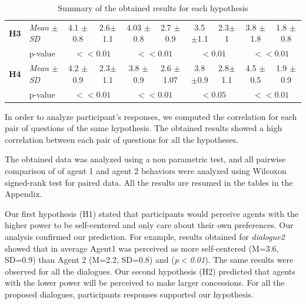 \documentclass{llncs}
\begin{document}
\begin{table}[t]
\begin{tabular}{|ll|c|c|c|c|c|c|c|c|}
			\newline \multirow{2}{*} {\textbf{H3}} &\multicolumn{1}{|l|}{ \textit{Mean} $\pm$ \textit{SD} } & 4.1 $\pm$ 0.8 & 2.6$\pm$ 1.1 & 4.03 $\pm$ 0.8 & 2.7 $\pm$0.9 &3.5 $\pm$1.1 & 2.3$\pm$ 1 & 3.8 $\pm$ 1.8 & 1.8 $\pm$0.8 \\
			\cline{2-10}	
			\newline & \multicolumn{1}{|l|}{p-value}  & \multicolumn{2}{c|}{ $<<0.01$} & \multicolumn{2}{c|}{ $<<0.01$} & \multicolumn{2}{c|}{ $<0.01$}& \multicolumn{2}{c|}{ $<<0.01$}\\
			\hline	
			
			
			\newline \multirow{2}{*} {\textbf{H4}} & \multicolumn{1}{|l|}{ \textit{Mean} $\pm$ \textit{SD} } & 4.2 $\pm$ 0.9 & 2.3$\pm$ 1.1  & 3.8 $\pm$0.9 & 2.6 $\pm$1.07 & 3.8 $\pm$0.9  & 2.8$\pm$ 1.1  & 4.5 $\pm$0.5  & 1.9 $\pm$ 0.9\\
			\cline{2-10}
			\newline & \multicolumn{1}{|l|}{p-value} & \multicolumn{2}{c|}{ $<<0.01$} & \multicolumn{2}{c|}{ $<<0.01$} & \multicolumn{2}{c|}{ $<0.05$}& \multicolumn{2}{c|}{ $<<0.01$}\\
			\hline	
		\end{tabular}
		\caption{Summary of the obtained results for each hypothesis}
	\end{table}
	In order to analyze participant's responses, we computed the correlation for each pair of questions of the same hypothesis. The obtained results showed a high correlation between each pair of questions for all the hypotheses.
	
	The obtained data was analyzed using a non parametric test, and all pairwise comparison of of agent 1 and agent 2 behaviors were analyzed using Wilcoxon signed-rank test for paired data. All the results are resumed in the tables in the Appendix.
	
	\par Our first hypothesis (H1) stated that participants would perceive agents with the higher power to be self-centered and only care about their own preferences. Our analysis confirmed our prediction. For example, results obtained for \textit{dialogue2} showed that in average Agent1 was perceived as more self-centered (M=3.6, SD=0.9) than Agent 2 (M=2.2, SD=0.8) and (\textit{p$<$0.01}). The same results were observed for all the dialogues. 
	Our second hypothesis (H2) predicted that agents with the lower power will be perceived to make larger concessions. For all the proposed dialogues, participants responses supported our hypothesis. 
\end{document}
